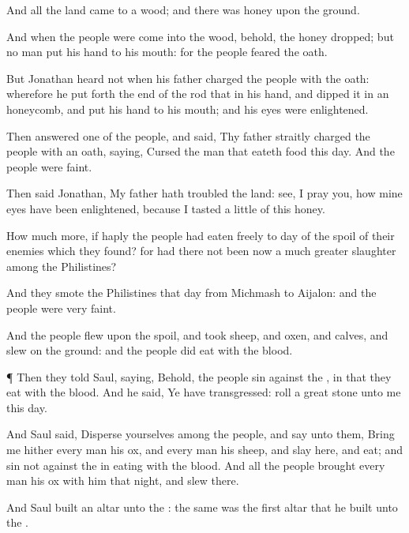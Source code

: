 {And all
{} the
land
came to a
wood; and there was
honey
upon the
ground.

And when the
people were
come into the
wood, behold, the
honey
dropped; but no man
put his
hand to his
mouth: for the
people
feared the
oath.

But
Jonathan
heard not when his
father
charged the
people with the
oath: wherefore he put
forth the
end of the
rod that
{} in his
hand, and
dipped it in an
honeycomb, and
put his
hand to his
mouth; and his
eyes were
enlightened.

Then
answered
one of the
people, and
said, Thy
father
straitly
charged the
people with an
oath,
saying,
Cursed
{} the
man that
eateth
{}
food this
day. And the
people were
faint.

Then
said
Jonathan, My
father hath
troubled the
land:
see, I pray you, how mine
eyes have been
enlightened, because I
tasted a
little of this
honey.

How much
more, if
haply the
people had
eaten
freely to
day of the
spoil of their
enemies which they
found? for had there not been now a much
greater
slaughter among the
Philistines?

And they
smote the
Philistines that
day from
Michmash to
Aijalon: and the
people were
very
faint.

And the
people
flew upon the
spoil, and
took
sheep, and
oxen, and
calves, and
slew
{} on the
ground: and the
people did
eat
{} with the
blood.


\par }{\PP {}¶ Then they
told
Saul,
saying, Behold, the
people
sin against the
{}, in that they
eat with the
blood. And he
said, Ye have
transgressed:
roll a
great
stone unto me this
day.

And
Saul
said,
Disperse yourselves among the
people, and
say unto them, Bring me
hither every
man his
ox, and every
man his
sheep, and
slay
{} here, and
eat; and
sin not against the
{} in
eating with the
blood. And all the
people
brought every
man his
ox with
him that
night, and
slew
{} there.

And
Saul
built an
altar unto the
{}: the same was the
first
altar that he
built unto the
{}.


}

